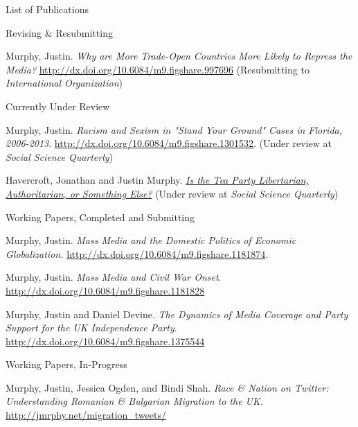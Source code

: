 \documentclass{resume} %
\begin{document}



\begin{rSection}{List of Publications}

\raggedright

\begin{rSubsection}{Revising \& Resubmitting}{}{}{}
\item Murphy, Justin. \emph{Why are More Trade-Open Countries More Likely to Repress the Media?} \url{http://dx.doi.org/10.6084/m9.figshare.997696} (Resubmitting to \emph{International Organization})
\end{rSubsection}

\begin{rSubsection}{Currently Under Review}{}{}{}
\item Murphy, Justin. \emph{Racism and Sexism in "Stand Your Ground" Cases in Florida, 2006-2013}. \url{http://dx.doi.org/10.6084/m9.figshare.1301532}. (Under review at \emph{Social Science Quarterly})
\item Havercroft, Jonathan and Justin Murphy. \href{https://www.academia.edu/14437108/Is_the_Tea_Party_Libertarian_Authoritarian_or_Something_Else}{\emph{Is the Tea Party Libertarian, Authoritarian, or Something Else?}} (Under review at \emph{Social Science Quarterly})
\end{rSubsection}

\begin{rSubsection}{Working Papers, Completed and Submitting}{}{}{}
\item Murphy, Justin. \emph{Mass Media and the Domestic Politics of Economic Globalization.} \url{http://dx.doi.org/10.6084/m9.figshare.1181874}. 
\item Murphy, Justin. \emph{Mass Media and Civil War Onset}. \url{http://dx.doi.org/10.6084/m9.figshare.1181828}
\item Murphy, Justin and Daniel Devine. \emph{The Dynamics of Media Coverage and Party Support for the UK Independence Party}. \url{http://dx.doi.org/10.6084/m9.figshare.1375544}
\end{rSubsection}

\begin{rSubsection}{Working Papers, In-Progress}{}{}{}
\item Murphy, Justin, Jessica Ogden, and Bindi Shah. \emph{Race \& Nation on Twitter: Understanding Romanian \& Bulgarian Migration to the UK.} \url{http://jmrphy.net/migration_tweets/}
\end{rSubsection}


\end{rSection}
\end{document}
